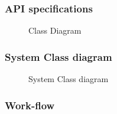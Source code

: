 \subsubsection{API specifications}

\begin{figure}[H]
\centering	
{}
\caption{Class Diagram}
\end{figure}

\subsubsection{System Class diagram}

\begin{figure}[H]
\centering	
{}
\caption{System Class diagram}
\end{figure}

\subsubsection{Work-flow}

